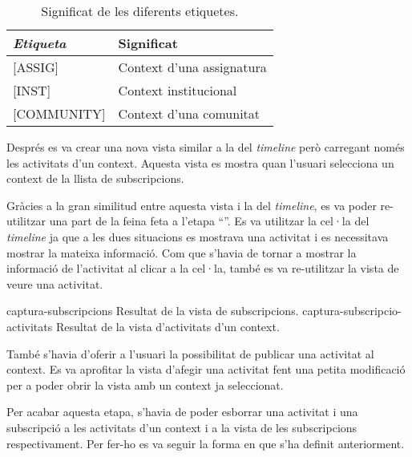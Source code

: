 \begin{table}[h]
    \begin{center}
    \begin{tabular}{| l | l |}
        \hline
            \textbf{\textit{Etiqueta}}  & \textbf{Significat}           \\ 
        \hline
            {[ASSIG]}                     & Context d'una assignatura     \\ 
            {[INST]}                      & Context institucional         \\
            {[COMMUNITY]}                 & Context d'una comunitat       \\
        \hline
    \end{tabular}
    \end{center}
    \caption{ Significat de les diferents etiquetes. \label{tagsContexts}}
\end{table}

Després es va crear una nova vista similar a la del \textit{timeline} però carregant només les activitats d'un context. Aquesta vista es mostra quan l'usuari selecciona un context de la llista de subscripcions.

Gràcies a la gran similitud entre aquesta vista i la del \textit{timeline}, es va poder re-utilitzar una part de la feina feta a l'etapa ``''. Es va utilitzar la cel·la del \textit{timeline} ja que a les dues situacions es mostrava una activitat i es necessitava mostrar la mateixa informació. Com que s'havia de tornar a mostrar la informació de l'activitat al clicar a la cel·la, també es va re-utilitzar la vista de veure una activitat.



\pintaDosImatges
    {captura-subscripcions}
        {Resultat de la vista de subscripcions.}
    {captura-subscripcio-activitats}
        {Resultat de la vista d'activitats d'un context.}


També s'havia d'oferir a l'usuari la possibilitat de publicar una activitat al context. Es va aprofitar la vista d'afegir una activitat fent una petita modificació per a poder obrir la vista amb un context ja seleccionat.

Per acabar aquesta etapa, s'havia de poder esborrar una activitat i una subscripció a les activitats d'un context i a la vista de les subscripcions respectivament. Per fer-ho es va seguir la forma en que s'ha definit anteriorment.

